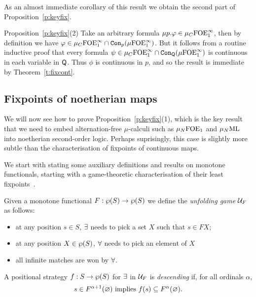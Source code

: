 \noindent
As an almost immediate corollary of this result we obtain the second part of 
Proposition~\ref{p:keyfix}.

\begin{proofof}{Proposition~\ref{p:keyfix}(2)}
Take an arbitrary formula $\mu p. \varphi \in \mu_{C}\mathrm{FOE}^{\infty}_1$, then by definition 
we have $\varphi \in \mu_{C}\mathrm{FOE}^{\infty}_1 \cap \mathtt{Con}_{p}(\mu\mathrm{FOE}^{\infty}_1)$.
But it follows from a routine inductive proof that every formula $\psi \in 
\mu_{C}\mathrm{FOE}^{\infty}_1 \cap \mathtt{Con}_{\mathsf{Q}}(\mu\mathrm{FOE}^{\infty}_1)$ is continuous in each variable 
in $\mathsf{Q}$.
Thus $\phi$ is continuous in $p$, and so the result is immediate by 
Theorem~\ref{t:fixcont}.
\end{proofof}



\subsection{Fixpoints of noetherian maps}

We will now see how to prove Proposition~\ref{p:keyfix}(1), which is the key 
result that we need to embed alternation-free $\mu$-calculi such as 
$\mu_{N}\mathrm{FOE}_1$ and $\mu_{N}\mathrm{ML}$ into noetherian second-order logic.
Perhaps suprisingly, this case is slightly more subtle than the characterisation of
fixpoints of continuous maps.

We start with stating some auxiliary definitions and results on monotone 
functionals, starting with a game-theoretic characterisation of their least
fixpoints~\cite{Ven08}.

\begin{definition}
\label{d:unfgame}
Given a monotone functional $F: \wp(S)\to \wp(S)$ we define the 
\emph{unfolding game} $\mathcal{U}_{F}$ as follows:
\begin{itemize}
\item at any position $s \in S$, $\exists$ needs to pick a set $X$ such that 
$s \in FX$;
\item at any position $X \in \wp(S)$, $\forall$ needs to pick an element of 
$X$
\item all infinite matches are won by $\forall$.
\end{itemize}
A positional strategy $f: S \to \wp(S)$ for $\exists$ in $\mathcal{U}_{F}$ is 
\emph{descending} if, for all ordinals $\alpha$,
\begin{equation}
\label{eq:dec}
s \in F^{\alpha+1}(\varnothing) \text{ implies } f(s) \subseteq F^{\alpha}(\varnothing).
\end{equation}
\end{definition}

